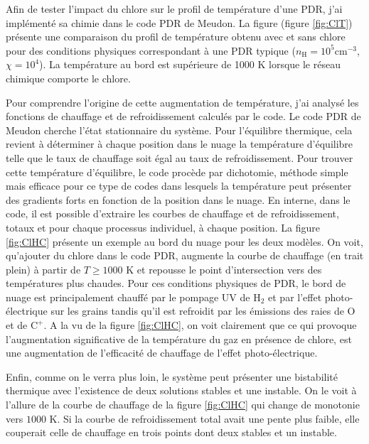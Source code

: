 Afin de tester l'impact du chlore sur le profil de température d'une PDR, j'ai implémenté sa chimie dans le code PDR de Meudon. La figure (figure \ref{fig:ClT}) présente une comparaison du profil de température obtenu avec et sans chlore pour des conditions physiques correspondant à une PDR typique ($n_{\mathrm{H}} = 10^5 \mathrm{cm}^{-3}$, $\chi = 10^4$). La température au bord est supérieure de 1000 K lorsque le réseau chimique comporte le chlore. \newline 

Pour comprendre l'origine de cette augmentation de température, j'ai analysé les fonctions de chauffage et de refroidissement calculés par le code. Le code PDR de Meudon cherche l'état stationnaire du système. Pour l'équilibre thermique, cela revient à déterminer à chaque position dans le nuage la température d'équilibre telle que le taux de chauffage soit égal au taux de refroidissement. Pour trouver cette température d'équilibre, le code procède par dichotomie, méthode simple mais efficace pour ce type de codes dans lesquels la température peut présenter des gradients forts en fonction de la position dans le nuage. En interne, dans le code, il est possible d'extraire les courbes de chauffage et de refroidissement, totaux et pour chaque processus individuel, à chaque position. La figure \ref{fig:ClHC} présente un exemple au bord du nuage pour les deux modèles. 
On voit, qu'ajouter du chlore dans le code PDR, augmente la courbe de chauffage (en trait plein) à partir de $T\geq 1000$ K et repousse le point d'intersection vers des températures plus chaudes. Pour ces conditions physiques de PDR, le bord de nuage est principalement chauffé par le pompage UV de $\mathrm{H}_2$ et par l'effet photo-électrique sur les grains tandis qu'il est refroidit par les émissions des raies de $\mathrm{O}$ et de $\mathrm{C}^+$. A la vu de la figure \ref{fig:ClHC}, on voit clairement que ce qui provoque l'augmentation significative de la température du gaz en présence de chlore, est une augmentation de l'efficacité de chauffage de l'effet photo-électrique. \newline 

Enfin, comme on le verra plus loin, le système peut présenter une bistabilité thermique avec l'existence de deux solutions stables et une instable. On le voit à l'allure de la courbe de chauffage de la figure \ref{fig:ClHC} qui change de monotonie vers $1000$ K. Si la courbe de refroidissement total avait une pente plus faible, elle couperait celle de chauffage en trois points dont deux stables et un instable.  


